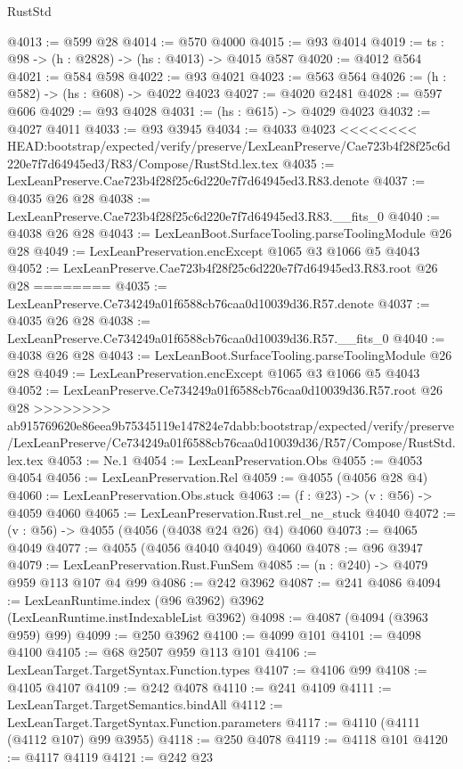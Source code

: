 \begin{lexlean}{RustStd}
\begin{coremodule}
{\begin{coremodule}
{{{{{{{{{@4013 := @599 @28
@4014 := @570 @4000
@4015 := @93 @4014
@4019 := {ts : @98} -> (h : @2828) -> (hs : @4013) -> @4015 @587
@4020 := @4012 @564
@4021 := @584 @598
@4022 := @93 @4021
@4023 := @563 @564
@4026 := (h : @582) -> (hs : @608) -> @4022 @4023
@4027 := @4020 @2481
@4028 := @597 @606
@4029 := @93 @4028
@4031 := (hs : @615) -> @4029 @4023
@4032 := @4027 @4011
@4033 := @93 @3945
@4034 := @4033 @4023
<<<<<<<< HEAD:bootstrap/expected/verify/preserve/LexLeanPreserve/Cae723b4f28f25c6d220e7f7d64945ed3/R83/Compose/RustStd.lex.tex
@4035 := LexLeanPreserve.Cae723b4f28f25c6d220e7f7d64945ed3.R83.denote
@4037 := @4035 @26 @28
@4038 := LexLeanPreserve.Cae723b4f28f25c6d220e7f7d64945ed3.R83.__fits_0
@4040 := @4038 @26 @28
@4043 := LexLeanBoot.SurfaceTooling.parseToolingModule @26 @28
@4049 := LexLeanPreservation.encExcept @1065 @3 @1066 @5 @4043
@4052 := LexLeanPreserve.Cae723b4f28f25c6d220e7f7d64945ed3.R83.root @26 @28
========
@4035 := LexLeanPreserve.Ce734249a01f6588cb76caa0d10039d36.R57.denote
@4037 := @4035 @26 @28
@4038 := LexLeanPreserve.Ce734249a01f6588cb76caa0d10039d36.R57.__fits_0
@4040 := @4038 @26 @28
@4043 := LexLeanBoot.SurfaceTooling.parseToolingModule @26 @28
@4049 := LexLeanPreservation.encExcept @1065 @3 @1066 @5 @4043
@4052 := LexLeanPreserve.Ce734249a01f6588cb76caa0d10039d36.R57.root @26 @28
>>>>>>>> ab915769620e86eea9b75345119e147824e7dabb:bootstrap/expected/verify/preserve/LexLeanPreserve/Ce734249a01f6588cb76caa0d10039d36/R57/Compose/RustStd.lex.tex
@4053 := Ne.{1}
@4054 := LexLeanPreservation.Obs
@4055 := @4053 @4054
@4056 := LexLeanPreservation.Rel
@4059 := @4055 (@4056 @28 @4)
@4060 := LexLeanPreservation.Obs.stuck
@4063 := (f : @23) -> (v : @56) -> @4059 @4060
@4065 := LexLeanPreservation.Rust.rel_ne_stuck @4040
@4072 := (v : @56) -> @4055 (@4056 (@4038 @24 @26) @4) @4060
@4073 := @4065 @4049
@4077 := @4055 (@4056 @4040 @4049) @4060
@4078 := @96 @3947
@4079 := LexLeanPreservation.Rust.FunSem
@4085 := (n : @240) -> @4079 @959 @113 @107 @4 @99
@4086 := @242 @3962
@4087 := @241 @4086
@4094 := LexLeanRuntime.index (@96 @3962) @3962 (LexLeanRuntime.instIndexableList @3962)
@4098 := @4087 (@4094 (@3963 @959) @99)
@4099 := @250 @3962
@4100 := @4099 @101
@4101 := @4098 @4100
@4105 := @68 @2507 @959 @113 @101
@4106 := LexLeanTarget.TargetSyntax.Function.types
@4107 := @4106 @99
@4108 := @4105 @4107
@4109 := @242 @4078
@4110 := @241 @4109
@4111 := LexLeanTarget.TargetSemantics.bindAll
@4112 := LexLeanTarget.TargetSyntax.Function.parameters
@4117 := @4110 (@4111 (@4112 @107) @99 @3955)
@4118 := @250 @4078
@4119 := @4118 @101
@4120 := @4117 @4119
@4121 := @242 @23
}}}}}}}}}
\end{coremodule}}
\end{coremodule}
\end{lexlean}
